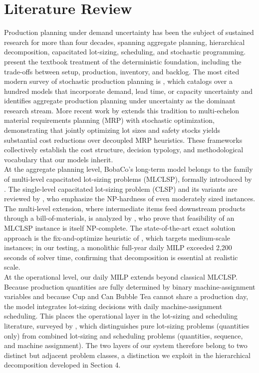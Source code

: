 \documentclass[11pt]{article}
\begin{document}
\section{Literature Review}
Production planning under demand uncertainty has been the subject of sustained research for more than four decades, spanning aggregate planning, hierarchical decomposition, capacitated lot-sizing, scheduling, and stochastic programming. \cite{nahmias2015poa} present the textbook treatment of the deterministic foundation, including the trade-offs between setup, production, inventory, and backlog. The most cited modern survey of stochastic production planning is \cite{mula2006review}, which catalogs over a hundred models that incorporate demand, lead time, or capacity uncertainty and identifies aggregate production planning under uncertainty as the dominant research stream. More recent work by \cite{thevenin2021mrp} extends this tradition to multi-echelon material requirements planning (MRP) with stochastic optimization, demonstrating that jointly optimizing lot sizes and safety stocks yields substantial cost reductions over decoupled MRP heuristics. These frameworks collectively establish the cost structure, decision typology, and methodological vocabulary that our models inherit. \\
\indent At the aggregate planning level, BobaCo's long-term model belongs to the family of multi-level capacitated lot-sizing problems (MLCLSP), formally introduced by \cite{billington1983mlclsp}. The single-level capacitated lot-sizing problem (CLSP) and its variants are reviewed by \cite{karimi2003cls}, who emphasize the NP-hardness of even moderately sized instances. The multi-level extension, where intermediate items feed downstream products through a bill-of-materials, is analyzed by \cite{maes1991mlcls}, who prove that feasibility of an MLCLSP instance is itself NP-complete. The state-of-the-art exact solution approach is the fix-and-optimize heuristic of \cite{helber2010mlclsp}, which targets medium-scale instances; in our testing, a monolithic full-year daily MILP exceeded 2,200 seconds of solver time, confirming that decomposition is essential at realistic scale.\\
\indent At the operational level, our daily MILP extends beyond classical MLCLSP. Because production quantities are fully determined by binary machine-assignment variables and because Cup and Can Bubble Tea cannot share a production day, the model integrates lot-sizing decisions with daily machine-assignment scheduling. This places the operational layer in the lot-sizing and scheduling literature, surveyed by \cite{drexl1997lss}, which distinguishes pure lot-sizing problems (quantities only) from combined lot-sizing and scheduling problems (quantities, sequence, and machine assignment). The two layers of our system therefore belong to two distinct but adjacent problem classes, a distinction we exploit in the hierarchical decomposition developed in Section 4.\\
\end{document}
